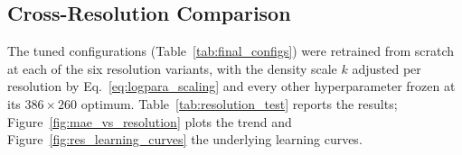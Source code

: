 %

\subsection{Cross-Resolution Comparison}
\label{sec:results_resolution}

The tuned configurations (Table~\ref{tab:final_configs}) were
retrained from scratch at each of the six resolution variants, with
the density scale $k$ adjusted per resolution by
Eq.~\eqref{eq:logpara_scaling} and every other hyperparameter frozen
at its $386\times260$ optimum. Table~\ref{tab:resolution_test} reports
the results; Figure~\ref{fig:mae_vs_resolution} plots the trend and
Figure~\ref{fig:res_learning_curves} the underlying learning curves.

